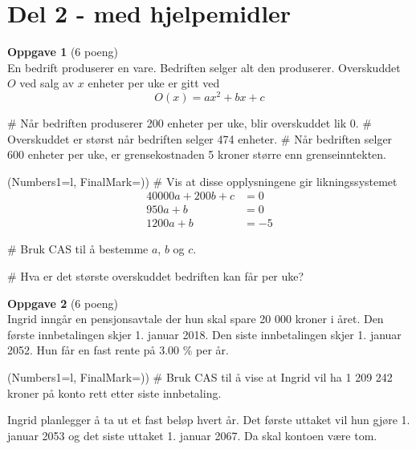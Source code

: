 \section*{Del 2 - med hjelpemidler}
\vspace*{2em}
{\bfseries \large Oppgave 1} (6 poeng) \vspace*{1em} \\
En bedrift produserer en vare.
Bedriften selger alt den produserer.
Overskuddet $O$ ved salg av $x$ enheter per uke er gitt ved
\begin{equation*}
	O(x) = ax^2 + bx + c
\end{equation*}
\begin{easylist}[itemize]
	# Når bedriften produserer 200 enheter per uke,
	blir overskuddet lik 0.
	# Overskuddet er størst når bedriften
	selger 474 enheter.
	# Når bedriften selger 600 enheter per uke,
	er grensekostnaden 5 kroner større enn grenseinntekten.
\end{easylist}
\begin{easylist}[enumerate]
	\ListProperties(Numbers1=l, FinalMark={)})
	# Vis at disse opplysningene gir likningssystemet
	\begin{align*}
	 40000a + 200b + c &= 0 \\
	 950 a + b &= 0 \\
	 1200a + b &= -5
	\end{align*}
	
	# Bruk CAS til å bestemme $a$, $b$ og $c$.
	
	# Hva er det største overskuddet bedriften
	kan får per uke?
\end{easylist}
\vfill
\vspace*{2em}
{\bfseries \large Oppgave 2} (6 poeng) \vspace*{1em} \\
Ingrid inngår en pensjonsavtale der hun skal spare 20 000
kroner i året. Den første innbetalingen skjer 1. januar 2018.
Den siste innbetalingen skjer 1. januar 2052.
Hun får en fast rente på 3.00 \% per år.
\begin{easylist}[enumerate]
	\ListProperties(Numbers1=l, FinalMark={)})
	# Bruk CAS til å vise at Ingrid vil ha
	1 209 242 kroner på konto rett etter
	siste innbetaling.
\end{easylist}
Ingrid planlegger å ta ut et fast beløp hvert år.
Det første uttaket vil hun gjøre 1. januar 2053 og
det siste uttaket 1. januar 2067. Da skal kontoen være tom.
